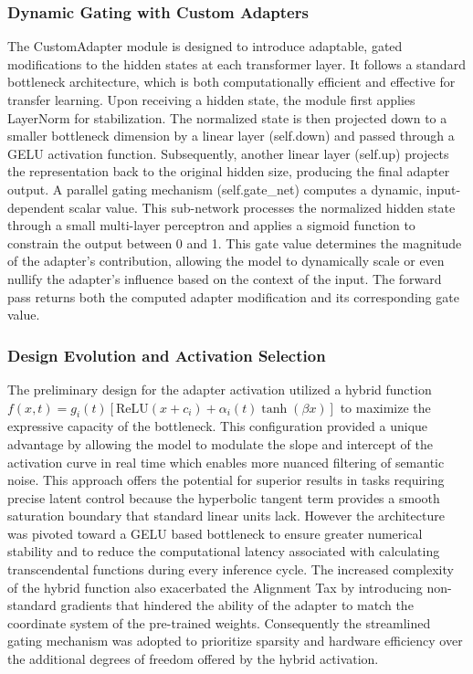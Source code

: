 \documentclass[11pt, letterpaper]{article}
\begin{document}
\subsubsection{Dynamic Gating with Custom Adapters}
The CustomAdapter module is designed to introduce adaptable, gated modifications to the hidden states at each transformer layer.
It follows a standard bottleneck architecture, which is both computationally efficient and effective for transfer learning. Upon receiving a hidden state, the module first applies LayerNorm for stabilization. The normalized state is then projected down to a smaller bottleneck dimension by a linear layer (self.down) and passed through a GELU activation function. Subsequently, another linear layer (self.up) projects the representation back to the original hidden size, producing the final adapter output. A parallel gating mechanism (self.gate\_net) computes a dynamic, input-dependent scalar value. This sub-network processes the normalized hidden state through a small multi-layer perceptron and applies a sigmoid function to constrain the output between 0 and 1. This gate value determines the magnitude of the adapter's contribution, allowing the model to dynamically scale or even nullify the adapter's influence based on the context of the input. The forward pass returns both the computed adapter modification and its corresponding gate value.

\subsubsection{Design Evolution and Activation Selection}
The preliminary design for the adapter activation utilized a hybrid function $f(x, t) = g_i(t)[\text{ReLU}(x + c_i) + \alpha_i(t)\tanh(\beta x)]$ to maximize the expressive capacity of the bottleneck. This configuration provided a unique advantage by allowing the model to modulate the slope and intercept of the activation curve in real time which enables more nuanced filtering of semantic noise. This approach offers the potential for superior results in tasks requiring precise latent control because the hyperbolic tangent term provides a smooth saturation boundary that standard linear units lack. However the architecture was pivoted toward a GELU based bottleneck to ensure greater numerical stability and to reduce the computational latency associated with calculating transcendental functions during every inference cycle. The increased complexity of the hybrid function also exacerbated the Alignment Tax by introducing non-standard gradients that hindered the ability of the adapter to match the coordinate system of the pre-trained weights. Consequently the streamlined gating mechanism was adopted to prioritize sparsity and hardware efficiency over the additional degrees of freedom offered by the hybrid activation.
\end{document}
